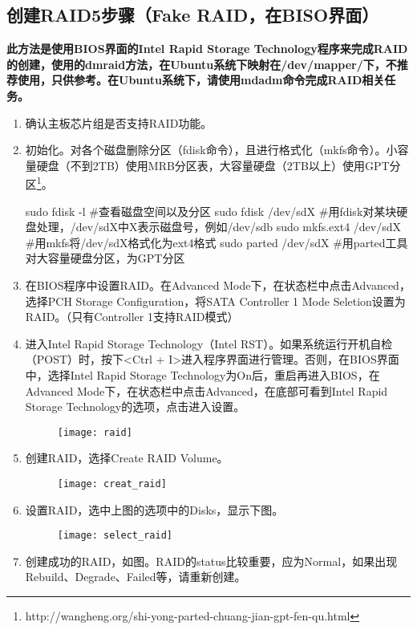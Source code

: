 \subsection{创建RAID5步骤（Fake RAID，在BISO界面）}
\textbf{此方法是使用BIOS界面的Intel Rapid Storage Technology程序来完成RAID的创建，使用的dmraid方法，在Ubuntu系统下映射在/dev/mapper/下，不推荐使用，只供参考。在Ubuntu系统下，请使用mdadm命令完成RAID相关任务。}
\begin{enumerate}
\item 确认主板芯片组是否支持RAID功能。
\item 初始化。对各个磁盘删除分区（fdisk命令），且进行格式化（mkfs命令）。小容量硬盘（不到2TB）使用MRB分区表，大容量硬盘（2TB以上）使用GPT分区\footnote{http://wangheng.org/shi-yong-parted-chuang-jian-gpt-fen-qu.html}。
\begin{bash}
sudo fdisk -l		   #查看磁盘空间以及分区
sudo fdisk /dev/sdX  #用fdisk对某块硬盘处理，/dev/sdX中X表示磁盘号，例如/dev/sdb
sudo mkfs.ext4 /dev/sdX    #用mkfs将/dev/sdX格式化为ext4格式
sudo parted /dev/sdX	#用parted工具对大容量硬盘分区，为GPT分区
\end{bash}
\item 在BIOS程序中设置RAID。在Advanced Mode下，在状态栏中点击Advanced，选择PCH Storage Configuration，将SATA Controller 1 Mode Seletion设置为RAID。（只有Controller 1支持RAID模式）
\item 进入Intel Rapid Storage Technology（Intel RST）。如果系统运行开机自检（POST）时，按下<Ctrl + I>进入程序界面进行管理。否则，在BIOS界面中，选择Intel Rapid Storage Technology为On后，重启再进入BIOS，在Advanced Mode下，在状态栏中点击Advanced，在底部可看到Intel Rapid Storage Technology的选项，点击进入设置。
\begin{figure}[!ht]
\centering
\texttt{[image: raid]}
\end{figure}
\item 创建RAID，选择Create RAID Volume。
\begin{figure}[!ht]
\centering
\texttt{[image: creat\_raid]}
\end{figure}
\item 设置RAID，选中上图的选项中的Disks，显示下图。
\begin{figure}[!ht]
\centering
\texttt{[image: select\_raid]}
\end{figure}
\item 创建成功的RAID，如图。RAID的status比较重要，应为Normal，如果出现Rebuild、Degrade、Failed等，请重新创建。
\begin{figure}[!ht]

\end{figure}
\end{enumerate}
